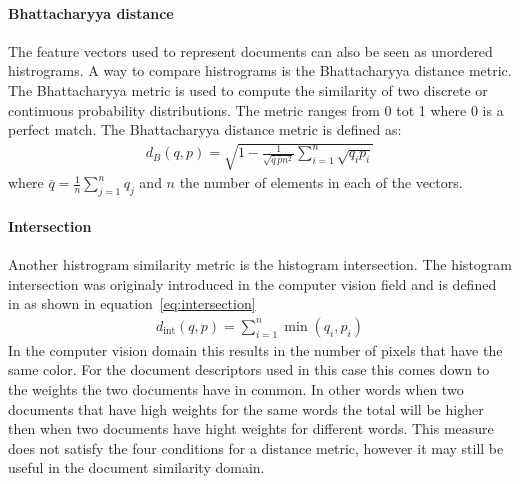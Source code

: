 \paragraph{Bhattacharyya distance} The feature vectors used to represent documents can
also be seen as unordered histrograms. A way to compare histrograms is the
Bhattacharyya distance metric. The Bhattacharyya metric is used to compute
the similarity of two discrete or continuous probability distributions. The 
metric ranges from 0 tot 1 where 0 is a perfect match. The Bhattacharyya 
distance metric is defined as:
\begin{align}
  d_B (q,p) = \sqrt{1 - \frac{1}{\sqrt{\overline{q}\,\overline{p}n^2}}\sum_{i=1}^n \sqrt{q_ip_i}}
\end{align}
where $\overline{q} = \frac{1}{n}\sum_{j=1}^n q_j$ and $n$ the number of
elements in each of the vectors.

\paragraph{Intersection} Another histrogram similarity metric is the histogram
intersection. The histogram intersection \citep{swain1991color} was originaly
introduced in the computer vision field and is defined in as shown in
equation~\ref{eq:intersection}
\begin{align}
  d_\textrm{int}(q,p) = \sum_{i=1}^n \min(q_i, p_i) \label{eq:intersection}
\end{align}
In the computer vision domain this results in the number of pixels that have
the same color. For the document descriptors used in this case this comes
down to the weights the two documents have in common. In other words when
two documents that have high weights for the same words the total will be
higher then when two documents have hight weights for different words. This
measure does not satisfy the four conditions for a distance metric, however
it may still be useful in the document similarity domain.

